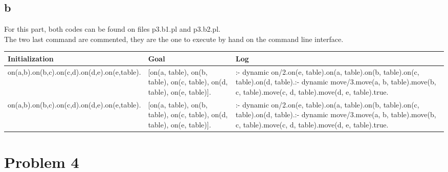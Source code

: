 \documentclass{article}
\begin{document}
        \subsection{b}
            For this part, both codes can be found on files p3.b1.pl and p3.b2.pl.\\
            The two last command are commented, they are the one to execute by hand on the command line interface.\\
            \begin{tabular}{|p{3cm}|p{6cm}|p{3cm}|}
                \hline
                \textbf{Initialization} & \textbf{Goal} & \textbf{Log}\\
                \hline
                    on(a,b).\newline on(b,c).\newline on(c,d).\newline on(d,e).\newline on(e,table). &
                    [on(a, table), on(b, table), on(c, table), on(d, table), on(e, table)].&
                    :- dynamic on/2.\newline on(e, table).\newline on(a, table).\newline on(b, table).\newline on(c, table).\newline on(d, table).\newline :- dynamic move/3.\newline move(a, b, table).\newline move(b, c, table).\newline move(c, d, table).\newline move(d, e, table).\newline true.\\
                \hline%
                    on(a,b).\newline on(b,c).\newline on(c,d).\newline on(d,e).\newline on(e,table). &
                    [on(a, table), on(b, table), on(c, table), on(d, table), on(e, table)].&
                    :- dynamic on/2.\newline on(e, table).\newline on(a, table).\newline on(b, table).\newline on(c, table).\newline on(d, table).\newline :- dynamic move/3.\newline move(a, b, table).\newline move(b, c, table).\newline move(c, d, table).\newline move(d, e, table).\newline true.\\
                \hline
            \end{tabular}

    \section{Problem 4}
\end{document}
